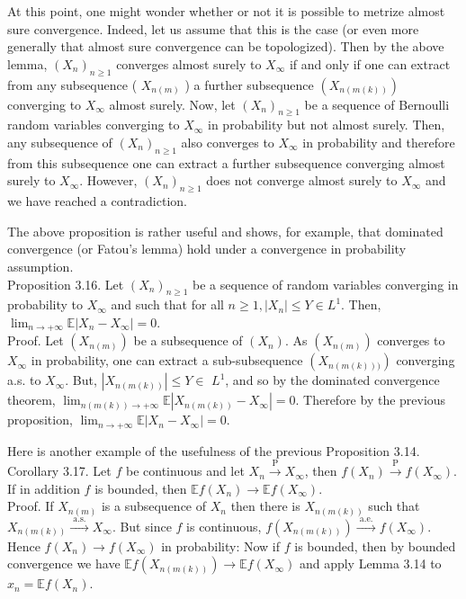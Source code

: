 \documentclass{amsbook}
\theoremstyle{plain}%
\theoremstyle{definition}
\theoremstyle{remark}
\begin{document}
  At this point, one might wonder whether or not it is possible to metrize almost sure convergence. Indeed, let us assume that this is the case (or even more generally that almost sure convergence can be topologized). Then by the above lemma, $\left(X_{n}\right)_{n \geq 1}$ converges almost surely to $X_{\infty}$ if and only if one can extract from any subsequence ( $X_{n(m)}$ ) a further subsequence $\left(X_{n(m(k))}\right)$ converging to $X_{\infty}$ almost surely. Now, let $\left(X_{n}\right)_{n \geq 1}$ be a sequence of Bernoulli random variables converging to $X_{\infty}$ in probability but not almost surely. Then, any subsequence of $\left(X_{n}\right)_{n \geq 1}$ also converges to $X_{\infty}$ in probability and therefore from this subsequence one can extract a further subsequence converging almost surely to $X_{\infty}$. However, $\left(X_{n}\right)_{n \geq 1}$ does not converge almost surely to $X_{\infty}$ and we have reached a contradiction.

  The above proposition is rather useful and shows, for example, that dominated convergence (or Fatou's lemma) hold under a convergence in probability assumption.\\
  Proposition 3.16. Let $\left(X_{n}\right)_{n \geq 1}$ be a sequence of random variables converging in probability to $X_{\infty}$ and such that for all $n \geq 1,\left|X_{n}\right| \leq Y \in L^{1}$. Then, $\lim _{n \rightarrow+\infty} \mathbb{E}\left|X_{n}-X_{\infty}\right|=0$.\\
Proof. Let $\left(X_{n(m)}\right)$ be a subsequence of $\left(X_{n}\right)$. As $\left(X_{n(m)}\right)$ converges to $X_{\infty}$ in probability, one can extract a sub-subsequence $\left(X_{n(m(k)))}\right)$ converging a.s. to $X_{\infty}$. But, $\left|X_{n(m(k))}\right| \leq Y \in$ $L^{1}$, and so by the dominated convergence theorem, $\lim _{n(m(k)) \rightarrow+\infty} \mathbb{E}\left|X_{n(m(k))}-X_{\infty}\right|=0$. Therefore by the previous proposition, $\lim _{n \rightarrow+\infty} \mathbb{E}\left|X_{n}-X_{\infty}\right|=0$.

Here is another example of the usefulness of the previous Proposition 3.14.\\
Corollary 3.17. Let $f$ be continuous and let $X_{n} \xrightarrow{\mathrm{P}} X_{\infty}$, then $f\left(X_{n}\right) \xrightarrow{\mathrm{P}} f\left(X_{\infty}\right)$. If in addition $f$ is bounded, then $\mathbb{E} f\left(X_{n}\right) \rightarrow \mathbb{E} f\left(X_{\infty}\right)$.\\
Proof. If $X_{n(m)}$ is a subsequence of $X_{n}$ then there is $X_{n(m(k))}$ such that $X_{n(m(k))} \xrightarrow{\text { a.s. }} X_{\infty}$. But since $f$ is continuous, $f\left(X_{n(m(k))}\right) \xrightarrow{\text { a.e. }} f\left(X_{\infty}\right)$. Hence $f\left(X_{n}\right) \rightarrow f\left(X_{\infty}\right)$ in probability: Now if $f$ is bounded, then by bounded convergence we have $\mathbb{E} f\left(X_{n(m(k))}\right) \rightarrow \mathbb{E} f\left(X_{\infty}\right)$ and apply Lemma 3.14 to $x_{n}=\mathbb{E} f\left(X_{n}\right)$.
\end{document}
